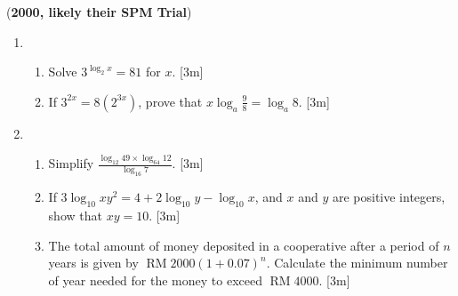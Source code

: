 \documentclass[notoc,notitlepage]{tufte-book}
\DeclareMathOperator{\RM}{RM}
\begin{document}
(\textbf{2000, likely their SPM Trial})
\begin{enumerate}
  \item 
    \begin{enumerate}
      \item Solve $3^{\log_2 x} = 81$ for $x$. [3m]
      \item If $3^{2x} = 8(2^{3x})$, prove that $x \log_a \frac{9}{8} = \log_a
        8$. [3m]
    \end{enumerate}

  \item 
    \begin{enumerate}
      \item Simplify $\frac{\log_{12} 49 \times \log_{64} 12}{\log_{16} 7}$. [3m]
      \item If $3 \log_{10} xy^2 = 4 + 2 \log_{10} y - \log_{10} x$, and $x$ and
        $y$ are positive integers, show that $xy = 10$. [3m]
      \item The total amount of money deposited in a cooperative after a period
        of $n$ years is given by $\RM 2000 (1 + 0.07)^n$. Calculate the minimum
        number of year needed for the money to exceed $\RM 4000$. [3m]
    \end{enumerate}
\end{enumerate}
\end{document}

